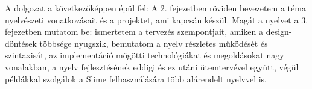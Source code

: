 A dolgozat a következőképpen épül fel: A 2. fejezetben röviden bevezetem a téma nyelvészeti vonatkozásait és a projektet, ami kapcsán készül. Magát a nyelvet a 3. fejezetben mutatom be: ismertetem a tervezés szempontjait, amiken a design-döntések többsége nyugszik, bemutatom a nyelv részletes működését és szintaxisát, az implementáció mögötti technológiákat és megoldásokat nagy vonalakban, a nyelv fejlesztésének eddigi és ez utáni ütemtervével együtt, végül példákkal szolgálok a Slime felhasználására több alárendelt nyelvvel is.